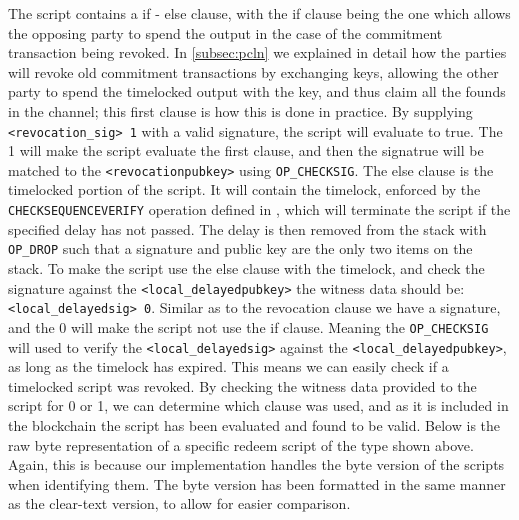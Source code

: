 The script contains a if - else clause, with the if clause being the one which allows the opposing party to spend the output in the case of the commitment transaction being revoked.  
In  \cref{subsec:pcln} we explained in detail how the parties will revoke old commitment transactions by exchanging keys, allowing the other party to spend the timelocked output with the key, and thus claim all the founds in the channel; this first clause is how this is done in practice.
By supplying {\tt <revocation\_sig> 1} with a valid signature, the script will evaluate to true. The 1 will make the script evaluate the first clause, and then the signatrue will be matched to the {\tt <revocationpubkey>} using {\tt OP\_CHECKSIG}.
The else clause is the timelocked portion of the script. It will contain the timelock, enforced by the {\tt CHECKSEQUENCEVERIFY} operation defined in \cite{BIP112}, which will terminate the script if the specified delay has not passed. The delay is then removed from the stack with {\tt OP\_DROP} such that a signature and public key are the only two items on the stack. 
To make the script use the else clause with the timelock, and check the signature against the {\tt <local\_delayedpubkey>} the witness data should be: {\tt <local\_delayedsig> 0}. Similar as to the revocation clause we have a signature, and the 0 will make the script not use the if clause. Meaning the {\tt OP\_CHECKSIG} will used to verify the {\tt <local\_delayedsig>} against the {\tt <local\_delayedpubkey>}, as long as the timelock has expired. This means we can easily check if a timelocked script was revoked. By checking the witness data provided to the script for 0 or 1, we can determine which clause was used, and as it is included in the blockchain the script has been evaluated and found to be valid.
Below is the raw byte representation of a specific redeem script of the type shown above. Again, this is because our implementation handles the byte version of the scripts when identifying them. The byte version has been formatted in the same manner as the clear-text version, to allow for easier comparison.
\\

\\

